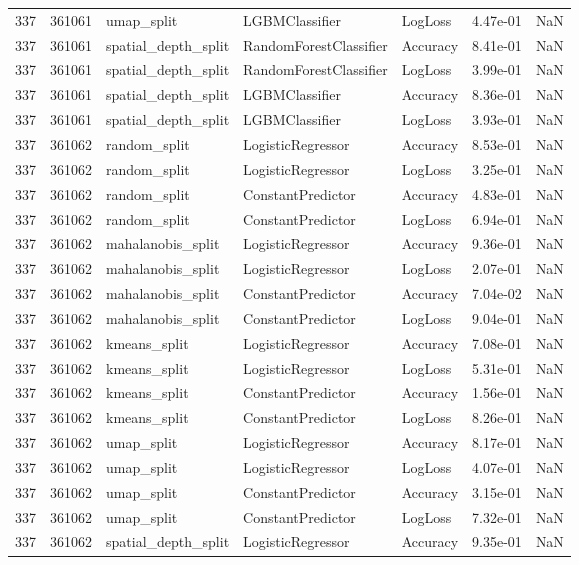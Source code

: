 \begin{tabular}{rrlllrr}
337 & 361061 & umap\_split & LGBMClassifier & LogLoss & 4.47e-01 & NaN \\
337 & 361061 & spatial\_depth\_split & RandomForestClassifier & Accuracy & 8.41e-01 & NaN \\
337 & 361061 & spatial\_depth\_split & RandomForestClassifier & LogLoss & 3.99e-01 & NaN \\
337 & 361061 & spatial\_depth\_split & LGBMClassifier & Accuracy & 8.36e-01 & NaN \\
337 & 361061 & spatial\_depth\_split & LGBMClassifier & LogLoss & 3.93e-01 & NaN \\
337 & 361062 & random\_split & LogisticRegressor & Accuracy & 8.53e-01 & NaN \\
337 & 361062 & random\_split & LogisticRegressor & LogLoss & 3.25e-01 & NaN \\
337 & 361062 & random\_split & ConstantPredictor & Accuracy & 4.83e-01 & NaN \\
337 & 361062 & random\_split & ConstantPredictor & LogLoss & 6.94e-01 & NaN \\
337 & 361062 & mahalanobis\_split & LogisticRegressor & Accuracy & 9.36e-01 & NaN \\
337 & 361062 & mahalanobis\_split & LogisticRegressor & LogLoss & 2.07e-01 & NaN \\
337 & 361062 & mahalanobis\_split & ConstantPredictor & Accuracy & 7.04e-02 & NaN \\
337 & 361062 & mahalanobis\_split & ConstantPredictor & LogLoss & 9.04e-01 & NaN \\
337 & 361062 & kmeans\_split & LogisticRegressor & Accuracy & 7.08e-01 & NaN \\
337 & 361062 & kmeans\_split & LogisticRegressor & LogLoss & 5.31e-01 & NaN \\
337 & 361062 & kmeans\_split & ConstantPredictor & Accuracy & 1.56e-01 & NaN \\
337 & 361062 & kmeans\_split & ConstantPredictor & LogLoss & 8.26e-01 & NaN \\
337 & 361062 & umap\_split & LogisticRegressor & Accuracy & 8.17e-01 & NaN \\
337 & 361062 & umap\_split & LogisticRegressor & LogLoss & 4.07e-01 & NaN \\
337 & 361062 & umap\_split & ConstantPredictor & Accuracy & 3.15e-01 & NaN \\
337 & 361062 & umap\_split & ConstantPredictor & LogLoss & 7.32e-01 & NaN \\
337 & 361062 & spatial\_depth\_split & LogisticRegressor & Accuracy & 9.35e-01 & NaN \\

\end{tabular}
